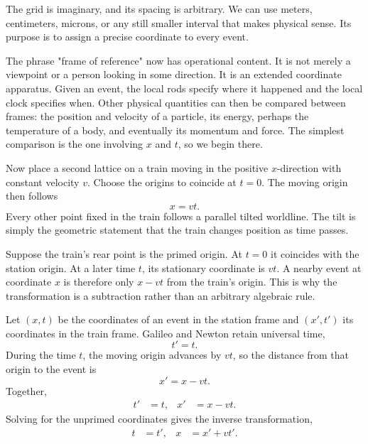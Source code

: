 The grid is imaginary, and its spacing is arbitrary. We can use meters, centimeters, microns, or any still smaller interval that makes physical sense. Its purpose is to assign a precise coordinate to every event.

The phrase "frame of reference" now has operational content. It is not merely a viewpoint or a person looking in some direction. It is an extended coordinate apparatus. Given an event, the local rods specify where it happened and the local clock specifies when. Other physical quantities can then be compared between frames: the position and velocity of a particle, its energy, perhaps the temperature of a body, and eventually its momentum and force. The simplest comparison is the one involving \(x\) and \(t\), so we begin there.

Now place a second lattice on a train moving in the positive \(x\)-direction with constant velocity \(v\). Choose the origins to coincide at \(t=0\). The moving origin then follows
\begin{equation}
x=vt.
\end{equation}
Every other point fixed in the train follows a parallel tilted worldline. The tilt is simply the geometric statement that the train changes position as time passes.

Suppose the train's rear point is the primed origin. At \(t=0\) it coincides with the station origin. At a later time \(t\), its stationary coordinate is \(vt\). A nearby event at coordinate \(x\) is therefore only \(x-vt\) from the train's origin. This is why the transformation is a subtraction rather than an arbitrary algebraic rule.

Let \((x,t)\) be the coordinates of an event in the station frame and \((x',t')\) its coordinates in the train frame. Galileo and Newton retain universal time,
\begin{equation}
t'=t.
\end{equation}
During the time \(t\), the moving origin advances by \(vt\), so the distance from that origin to the event is
\begin{equation}
x'=x-vt.
\end{equation}
Together,
\begin{align}
t'&=t, & x'&=x-vt.
\label{eq:galilean-forward}
\end{align}
Solving for the unprimed coordinates gives the inverse transformation,
\begin{align}
t&=t', & x&=x'+vt'.
\label{eq:galilean-inverse}
\end{align}

